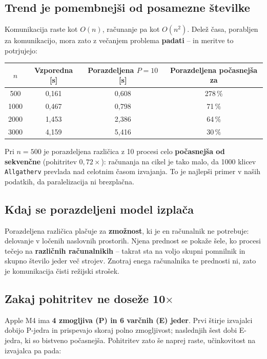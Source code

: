 \documentclass[11pt,a4paper]{article}
\begin{document}
\subsection{Trend je pomembnej\v{s}i od posamezne \v{s}tevilke}
Komunikacija raste kot $O(n)$, ra\v{c}unanje pa kot $O(n^2)$. Dele\v{z} \v{c}asa, porabljen za komunikacijo, mora zato z ve\v{c}anjem problema \textbf{padati} -- in meritve to potrjujejo:

\begin{center}
\begin{tabular}{|c|c|c|c|}
\hline
$n$ & Vzporedna [s] & Porazdeljena $P{=}10$ [s] & Porazdeljena po\v{c}asnej\v{s}a za \\
\hline
500  & 0,161 & 0,608 & 278\,\% \\
1000 & 0,467 & 0,798 & 71\,\% \\
2000 & 1,453 & 2,386 & 64\,\% \\
3000 & 4,159 & 5,416 & 30\,\% \\
\hline
\end{tabular}
\end{center}

Pri $n = 500$ je porazdeljena razli\v{c}ica z 10 procesi celo \textbf{po\v{c}asnej\v{s}a od sekven\v{c}ne} (pohitritev $0{,}72\times$): ra\v{c}unanja na cikel je tako malo, da 1000 klicev \texttt{Allgatherv} prevlada nad celotnim \v{c}asom izvajanja. To je najlep\v{s}i primer v na\v{s}ih podatkih, da paralelizacija ni brezpla\v{c}na.

\subsection{Kdaj se porazdeljeni model izpla\v{c}a}
Porazdeljena razli\v{c}ica pla\v{c}uje za \textbf{zmo\v{z}nost}, ki je en ra\v{c}unalnik ne potrebuje: delovanje v lo\v{c}enih naslovnih prostorih. Njena prednost se poka\v{z}e \v{s}ele, ko procesi te\v{c}ejo na \textbf{razli\v{c}nih ra\v{c}unalnikih} -- takrat sta na voljo skupni pomnilnik in skupno \v{s}tevilo jeder ve\v{c} strojev. Znotraj enega ra\v{c}unalnika te prednosti ni, zato je komunikacija \v{c}isti re\v{z}ijski stro\v{s}ek.

\subsection{Zakaj pohitritev ne dose\v{z}e 10$\times$}
Apple M4 ima \textbf{4 zmogljiva (P) in 6 var\v{c}nih (E) jeder}. Prvi \v{s}tirje izvajalci dobijo P-jedra in prispevajo skoraj polno zmogljivost; naslednjih \v{s}est dobi E-jedra, ki so bistveno po\v{c}asnej\v{s}a. Pohitritev zato \v{s}e naprej raste, u\v{c}inkovitost na izvajalca pa pada:
\end{document}
